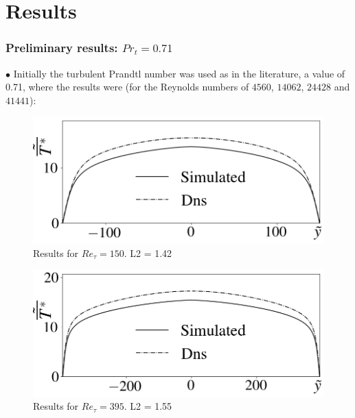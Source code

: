\documentclass[xcolor=dvipsnames,8pt,aspectratio=34]{beamer}
\begin{document}
	\section{Results}
		\begin{frame}
			\frametitle{Preliminary results: $Pr_t= 0.71$}
				$\bullet$ Initially the turbulent Prandtl number was used as in the literature, a value of 0.71, where the results were (for the Reynolds numbers of $4560$, $14062$, $24428$ and $41441$):\\
			\begin{minipage}[h!]{0.5\textwidth}
			\begin{figure}
				\centering
				\includegraphics[angle=0, scale=0.24]{fotos_formatacao_final/Temperature_150_071_classico}
				\caption{Results for $Re_\tau = 150$. L2 = 1.42 }
			\end{figure}
			\end{minipage}
				\begin{minipage}[h!]{0.49\textwidth}
				\begin{figure}
					\centering
					\includegraphics[angle=0, scale=0.24]{fotos_formatacao_final/Temperature_395_071_classico}
					\caption{Results for $Re_\tau = 395$. L2 = 1.55}
				\end{figure}
			\end{minipage}	\\
			\begin{minipage}[h!]{0.5\textwidth}

\end{minipage}
\end{frame}
\end{document}
